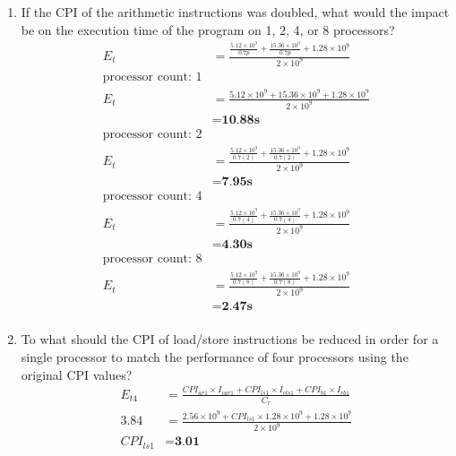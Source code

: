 \documentclass[10pt]{article}
\begin{document}
\begin{enumerate}
\begin{enumerate}
        \item
        If the CPI of the arithmetic instructions was doubled, what would the impact be on the execution time of the program on 1, 2, 4, or 8 processors?
        \begin{align*}
            E_t &= \frac{\frac{5.12 \times 10^9}{0.7p} + \frac{15.36 \times 10^9}{0.7p} + 1.28 \times 10^9}{2 \times 10^9}\\
            \text{processor count: 1}\\
            E_t &= \frac{5.12 \times 10^9 + 15.36 \times 10^9 + 1.28 \times 10^9}{2 \times 10^9}\\
            &= \textbf{10.88s}\\
            \text{processor count: 2}\\
            E_t &= \frac{\frac{5.12 \times 10^9}{0.7(2)} + \frac{15.36 \times 10^9}{0.7(2)} + 1.28 \times 10^9}{2 \times 10^9}\\
            &= \textbf{7.95s}\\
            \text{processor count: 4}\\
            E_t &= \frac{\frac{5.12 \times 10^9}{0.7(4)} + \frac{15.36 \times 10^9}{0.7(4)} + 1.28 \times 10^9}{2 \times 10^9}\\
            &= \textbf{4.30s}\\
            \text{processor count: 8}\\
            E_t &= \frac{\frac{5.12 \times 10^9}{0.7(8)} + \frac{15.36 \times 10^9}{0.7(8)} + 1.28 \times 10^9}{2 \times 10^9}\\
            &= \textbf{2.47s}\\
        \end{align*}
        \item
        To what should the CPI of load/store instructions be reduced in order for a single processor to match the performance of four processors using the original CPI values?
        \begin{align*}
            E_{t4} &= \frac{CPI_{ar1} \times I_{car1} + CPI_{ls1} \times I_{cls1} + CPI_{b1} \times I_{cb1}}{C_r}\\
            3.84 &= \frac{2.56 \times 10^9 +  CPI_{ls1} \times 1.28 \times 10^9 + 1.28 \times 10^9}{2 \times 10^9}\\
            CPI_{ls1} &= \textbf{3.01}
        \end{align*}
    \end{enumerate}

\end{enumerate}
\end{document}
